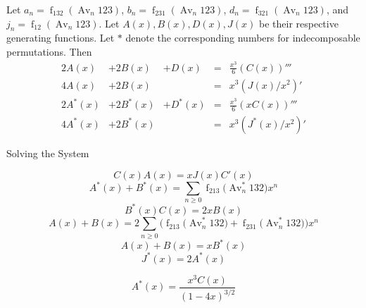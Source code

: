 \documentclass[xcolor=dvipsnames]{beamer}
\newcommand{\Avn}{\Av_n   123 }
\DeclareMathOperator{\Av}{Av}
\DeclareMathOperator{\num}{f}
\theoremstyle{definition}            %
\begin{document}
\begin{frame}
  \begin{lemma}
    Let $a_n = \num_{132}(\Avn)$, $b_n = \num_{231}(\Avn)$, $d_n =
    \num_{321}(\Avn)$, and $j_n = \num_{12}(\Avn)$. Let $A(x), B(x),
    D(x), J(x)$ be their respective generating functions. Let $*$
    denote the corresponding numbers for indecomposable permutations.
    Then 
    $$ \begin{array}{ccccc}
      2A(x) & + 2B(x) & + D(x) & = & \frac{x^3}{6} (C(x))''' \\
      4A(x) & + 2B(x) & & =&  x^3(J(x)/x^2)' \\
      2A^*(x) & + 2B^*(x) & + D^*(x) & = & \frac{x^3}{6} (xC(x))'''\\
      4A^*(x)& + 2B^*(x)& & =& x^3(J^*(x) /x^2)' 
      \end{array} $$
  \end{lemma}

\end{frame}


\begin{frame}{Solving the System}
  \begin{block}{}
    \pause
    $$ C(x) A(x)  = xJ(x) C'(x)$$
    \pause
    $$ A^*(x) + B^*(x) = \sum_{n\geq 0} \num_{213} \big(\Av_n^* 132
    \big) x^n $$ 
    \pause
    $$ B^*(x) C(x) = 2xB(x) $$
    \pause
    $$ A(x)+B(x) = 2\sum_{n\geq 0} \Big(\num_{213} \big( \Av ^*_n
    132 \big) + \num_{231} \big( \Av ^*_n 132 \big)\Big) x^n $$
    \pause
    $$ A(x) + B(x) = xB^*(x) $$
    \pause
    $$ J^*(x)  = 2A^*(x) $$
  \end{block}
\end{frame}


\begin{frame}

  \begin{lemma}
    $$A^*(x) = \frac{x^3C(x)}{(1-4x)^{3/2}}$$
  \end{lemma}

\end{frame}
\end{document}
